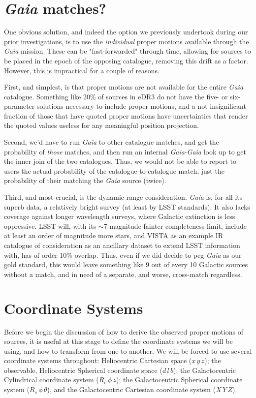 \documentclass[fleqn,usenatbib]{mnras}
\begin{document}
\section{\textit{Gaia} matches?}
One obvious solution, and indeed the option we previously undertook during our prior investigations, is to use the \textit{individual} proper motions available through the \textit{Gaia} mission. These can be "fast-forwarded" through time, allowing for sources to be placed in the epoch of the opposing catalogue, removing this drift as a factor. However, this is impractical for a couple of reasons.

First, and simplest, is that proper motions are not available for the entire \textit{Gaia} catalogue. Something like 20\% of sources in eDR3 do not have the five- or six-parameter solutions necessary to include proper motions, and a not insignificant fraction of those that have quoted proper motions have uncertainties that render the quoted values useless for any meaningful position projection.

Second, we'd have to run \textit{Gaia} to other catalogue matches, and get the probability of \textit{those} matches, and then run an internal \textit{Gaia}-\textit{Gaia} look up to get the inner join of the two catalogues. Thus, we would not be able to report to users the actual probability of the catalogue-to-catalogue match, just the probability of their matching the \textit{Gaia} source (twice).

Third, and most crucial, is the dynamic range consideration. \textit{Gaia} is, for all its superb data, a relatively bright survey (at least by LSST standards). It also lacks coverage against longer wavelength surveys, where Galactic extinction is less oppressive. LSST will, with its $\sim$7 magnitude fainter completeness limit, include at least an order of magnitude more stars, and VISTA as an example IR catalogue of consideration as an ancillary dataset to extend LSST information with, has of order 10\% overlap. Thus, even if we did decide to peg \textit{Gaia} as our gold standard, this would leave something like 9 out of every 10 Galactic sources without a match, and in need of a separate, and worse, cross-match regardless.

\section{Coordinate Systems}
Before we begin the discussion of how to derive the observed proper motions of sources, it is useful at this stage to define the coordinate systems we will be using, and how to transform from one to another. We will be forced to use several coordinate systems throughout: Heliocentric Cartesian space ($x\,y\,z$); the observable, Heliocentric Spherical coordinate space ($d\,l\,b$); the Galactocentric Cylindrical coordinate system ($R_c\,\phi\,z$); the Galactocentric Spherical coordinate system ($R_s\,\phi\,\theta$), and the Galactocentric Cartesian coordinate system ($X\,Y\,Z$).
\end{document}

